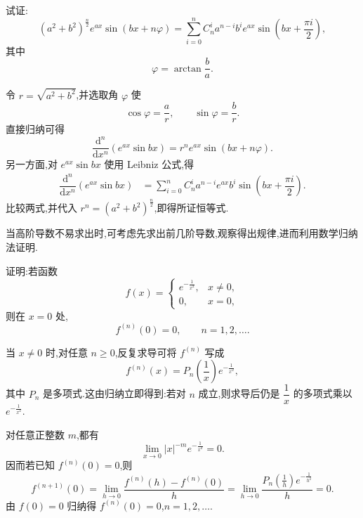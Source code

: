 \begin{example}
    试证:
    \[
        (a^2+b^2)^{\frac{n}{2}}e^{ax}\sin(bx+n\varphi)
        =\sum\limits_{i=0}^n C_{n}^{i}a^{n-i}b^i e^{ax}
        \sin\left(bx+\dfrac{\pi i}{2}\right),
    \]
    其中
    \[
        \varphi=\arctan\dfrac{b}{a}.
    \]
\end{example}
\exampleblank

\begin{solution}
    令 $r=\sqrt{a^2+b^2}$,并选取角 $\varphi$ 使
    \[
        \cos\varphi=\dfrac{a}{r},
        \qquad
        \sin\varphi=\dfrac{b}{r}.
    \]
    直接归纳可得
    \[
        \dfrac{\mathrm{d}^n}{\mathrm{d}x^n}
        \left(e^{ax}\sin bx\right)
        =r^n e^{ax}\sin(bx+n\varphi).
    \]
    另一方面,对 $e^{ax}\sin bx$ 使用 Leibniz 公式,得
    \[
        \begin{aligned}
            \dfrac{\mathrm{d}^n}{\mathrm{d}x^n}
            \left(e^{ax}\sin bx\right)
             & =\sum\limits_{i=0}^{n}C_{n}^{i}
            a^{n-i}e^{ax}b^i
            \sin\left(bx+\dfrac{\pi i}{2}\right).
        \end{aligned}
    \]
    比较两式,并代入 $r^n=(a^2+b^2)^{\frac{n}{2}}$,即得所证恒等式.
\end{solution}




当高阶导数不易求出时,可考虑先求出前几阶导数,观察得出规律,进而利用数学归纳法证明.

\begin{example}[\markstar]
    证明:若函数
    \[
        f(x)=
        \begin{cases}
            e^{-\frac{1}{x^2}}, & x\neq0, \\
            0,                  & x=0,
        \end{cases}
    \]
    则在 $x=0$ 处,
    \[
        f^{(n)}(0)=0,
        \qquad n=1,2,\ldots.
    \]
\end{example}
\exampleblank

\begin{solution}
    当 $x\neq0$ 时,对任意 $n\geq0$,反复求导可将 $f^{(n)}$ 写成
    \[
        f^{(n)}(x)=P_n\left(\dfrac{1}{x}\right)e^{-\frac{1}{x^2}},
    \]
    其中 $P_n$ 是多项式.这由归纳立即得到:若对 $n$ 成立,则求导后仍是 $\dfrac{1}{x}$ 的多项式乘以 $e^{-\frac{1}{x^2}}$.

    对任意正整数 $m$,都有
    \[
        \displaystyle\lim\limits_{x\to0}|x|^{-m}e^{-\frac{1}{x^2}}=0.
    \]
    因而若已知 $f^{(n)}(0)=0$,则
    \[
        f^{(n+1)}(0)
        =\lim\limits_{h\to0}\dfrac{f^{(n)}(h)-f^{(n)}(0)}{h}
        =\lim\limits_{h\to0}
        \dfrac{P_n\left(\frac{1}{h}\right)e^{-\frac{1}{h^2}}}{h}=0.
    \]
    由 $f(0)=0$ 归纳得 $f^{(n)}(0)=0$,$n=1,2,\ldots$.
\end{solution}

